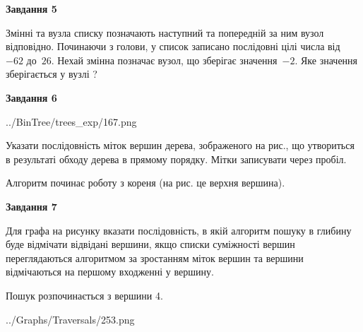 \documentclass[12pt, ukrainian]{article}
\begin{document}
{\begin {large}
{\begin {center}\textbf{Завдання 5}\end {center}}\par
Змінні  та  вузла списку позначають наступний та попередній за ним вузол відповідно. Починаючи з голови, у список записано послідовні цілі числа від~$-62$ до~$26$. Нехай змінна  позначає вузол, що зберігає значення~$-2$.
Яке значення зберігається у вузлі  ?\par
\newpage

{\begin {center}\textbf{Завдання 6}\end {center}}\par

\begin{center}
	{../BinTree/trees_exp/167.png}
\end{center}
Указати послідовність міток вершин дерева, зображеного на рис., що утвориться в результаті обходу дерева в прямому порядку. Мітки записувати через пробіл.\par Алгоритм починає роботу з кореня (на рис. це верхня вершина).\par
\newpage

{\begin {center}\textbf{Завдання 7}\end {center}}\par
Для графа на рисунку вказати послідовність, в якій алгоритм пошуку в глибину буде відмічати відвідані вершини, якщо списки суміжності вершин переглядаються алгоритмом за зростанням міток вершин та вершини відмічаються на першому вход\-женні у вершину.\par
Пошук розпочинається з вершини 4.\par

\begin{center}
	{../Graphs/Traversals/253.png}
\end{center}\par
\newpage


\end{large}}
\end{document}
